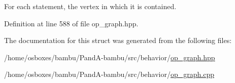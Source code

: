 For each statement, the vertex in which it is contained. 



Definition at line 588 of file op\+\_\+graph.\+hpp.



The documentation for this struct was generated from the following files\+:\begin{DoxyCompactItemize}
\item 
/home/osboxes/bambu/\+Pand\+A-\/bambu/src/behavior/\hyperlink{op__graph_8hpp}{op\+\_\+graph.\+hpp}\item 
/home/osboxes/bambu/\+Pand\+A-\/bambu/src/behavior/\hyperlink{op__graph_8cpp}{op\+\_\+graph.\+cpp}\end{DoxyCompactItemize}
